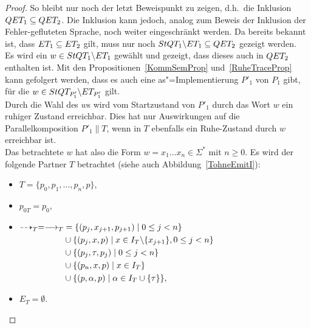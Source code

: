 \begin{proof}
  So bleibt nur noch der letzt Beweispunkt zu zeigen, d.h.\ die Inklusion $QET
  _1\subseteq QET _2$. Die Inklusion kann jedoch, analog zum Beweis der
  Inklusion der Fehler-gefluteten Sprache, noch weiter eingeschränkt werden. Da
  bereits bekannt ist, dass $ET _1\subseteq ET _2$ gilt, muss nur noch $StQT
  _1\backslash ET _1\subseteq QET _2$ gezeigt werden.\\
  Es wird ein $w\in StQT _1\backslash ET _1$ gewählt und gezeigt, dass dieses
  auch in $QET _2$ enthalten ist. Mit den Propositionen~\ref{KommSemProp}
  und~\ref{RuheTraceProp} kann gefolgert werden, dass es auch eine
  as"=Implementierung $P'_1$ von $P_1$ gibt, für die $w\in StQT _{P'_1}
  \backslash ET _{P'_1}$ gilt.\\
  Durch die Wahl des $w$s wird vom Startzustand von $P'_1$ durch das Wort $w$
  ein ruhiger Zustand erreichbar. Dies hat nur Auswirkungen auf die
  Parallelkomposition $P'_1\|T$, wenn in $T$ ebenfalls ein Ruhe-Zustand durch
  $w$ erreichbar ist.\\
  Das betrachtete $w$ hat also die Form $w=x_1\dots x_n\in\Sigma ^*$ mit $n\geq
  0$. Es wird der folgende Partner $T$ betrachtet (siehe auch
  Abbildung~\ref{TohneEmitI}):
  \begin{itemize}
    \item $T=\{p_0,p_1,\dots ,p_n, p\}$,
    \item $p_{0T}=p_0$,
    \item $\begin{aligned}[t]
        \may _T = \must _T&=\{(p_j,x_{j+1},p_{j+1})\mid  0\leq j< n\}\\
        &\cup\{(p_j,x,p)\mid  x\in I_T\backslash\{x_{j+1}\}, 0\leq j< n\}\\
        &\cup\{(p_j,\tau,p_j)\mid 0\leq j< n\}\\
        &\cup\{(p_n,x,p)\mid x\in I_T\}\\
        &\cup\{(p,\alpha,p)\mid \alpha\in I_T\cup\{\tau\}\},
    \end{aligned}$
    \item $E_T=\emptyset$.
  \end{itemize}
  \begin{figure} [h!tbp]
  \begin{center}
\end{center}
\end{figure}
\end{proof}

